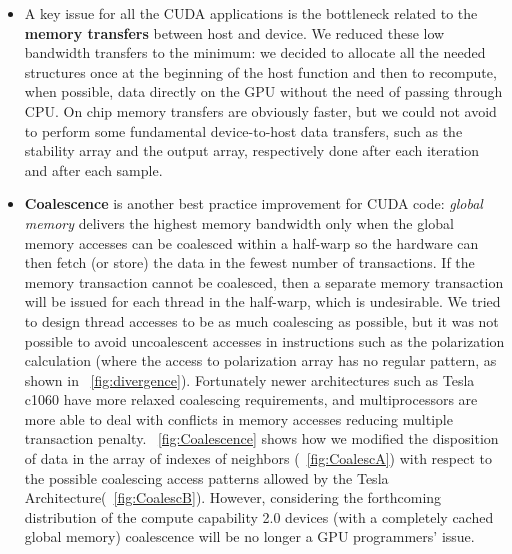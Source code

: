 \begin{itemize}
\item A key issue for all the CUDA applications is the bottleneck related to the \textbf{memory transfers} between host and device.
We reduced these low bandwidth transfers to the minimum: we decided to allocate all the needed structures once at the beginning of
the host function and then to recompute, when possible, data directly on the GPU without the need of passing through CPU. On chip memory transfers are
obviously faster, but we could not avoid to perform some fundamental device-to-host data transfers, such as the stability array and the output
array, respectively done after each iteration and after each sample.


\item \textbf{Coalescence} is another best practice improvement for CUDA code: \textit{global memory} delivers the highest memory 
bandwidth only when the global memory accesses can be coalesced within a half-warp so the hardware can then fetch (or store) the data
 in the fewest number of transactions. If the memory transaction cannot be coalesced, then a separate memory transaction will be issued 
for each thread in the half-warp, which is undesirable. We tried to design thread accesses to be as much coalescing as possible, but it 
was not possible to avoid uncoalescent accesses in instructions such as the polarization calculation (where the access to polarization 
array has no regular pattern, as shown in \figurename~\ref{fig:divergence}). Fortunately newer architectures such as Tesla c1060 have more relaxed coalescing requirements, and 
multiprocessors are more able to deal with conflicts in memory accesses reducing multiple transaction penalty.\newline
\figurename~\ref{fig:Coalescence} shows how we modified the disposition of data in the array of indexes of neighbors (\figurename~\ref{fig:CoalescA}) 
with respect to the possible coalescing access patterns allowed by the Tesla Architecture(\figurename~\ref{fig:CoalescB}).\newline
However, considering the forthcoming distribution of the compute capability 2.0 devices (with a completely cached global memory)
coalescence will be no longer a GPU programmers' issue.


\end{itemize}
